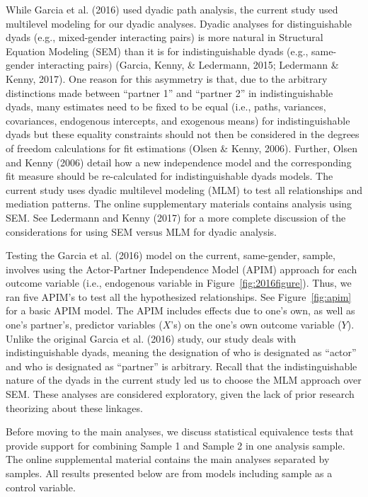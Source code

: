 \documentclass[man]{apa6}
\begin{document}
While Garcia et al. (2016) used dyadic path analysis, the current study
used multilevel modeling for our dyadic analyses. Dyadic analyses for
distinguishable dyads (e.g., mixed-gender interacting pairs) is more
natural in Structural Equation Modeling (SEM) than it is for
indistinguishable dyads (e.g., same-gender interacting pairs) (Garcia,
Kenny, \& Ledermann, 2015; Ledermann \& Kenny, 2017). One reason for
this asymmetry is that, due to the arbitrary distinctions made between
\enquote{partner 1} and \enquote{partner 2} in indistinguishable dyads,
many estimates need to be fixed to be equal (i.e., paths, variances,
covariances, endogenous intercepts, and exogenous means) for
indistinguishable dyads but these equality constraints should not then
be considered in the degrees of freedom calculations for fit estimations
(Olsen \& Kenny, 2006). Further, Olsen and Kenny (2006) detail how a new
independence model and the corresponding fit measure should be
re-calculated for indistinguishable dyads models. The current study uses
dyadic multilevel modeling (MLM) to test all relationships and mediation
patterns. The online supplementary materials contains analysis using
SEM. See Ledermann and Kenny (2017) for a more complete discussion of
the considerations for using SEM versus MLM for dyadic analysis.

Testing the Garcia et al. (2016) model on the current, same-gender,
sample, involves using the Actor-Partner Independence Model (APIM)
approach for each outcome variable (i.e., endogenous variable in
Figure~\ref{fig:2016figure}). Thus, we ran five APIM's to test all the
hypothesized relationships. See Figure~\ref{fig:apim} for a basic APIM
model. The APIM includes effects due to one's own, as well as one's
partner's, predictor variables (\(X\)'s) on the one's own outcome
variable (\(Y\)). Unlike the original Garcia et al. (2016) study, our
study deals with indistinguishable dyads, meaning the designation of who
is designated as \enquote{actor} and who is designated as
\enquote{partner} is arbitrary. Recall that the indistinguishable nature
of the dyads in the current study led us to choose the MLM approach over
SEM. These analyses are considered exploratory, given the lack of prior
research theorizing about these linkages.

Before moving to the main analyses, we discuss statistical equivalence
tests that provide support for combining Sample 1 and Sample 2 in one
analysis sample. The online supplemental material contains the main
analyses separated by samples. All results presented below are from
models including sample as a control variable.
\end{document}
